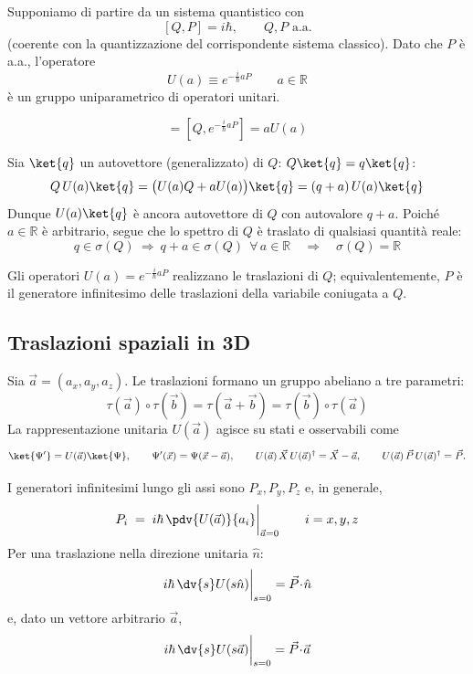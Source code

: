 Supponiamo di partire da un sistema quantistico con
\[
    [Q,P]= i\hbar , \qquad Q,P \text{ a.a.}
\]
(coerente con la quantizzazione del corrispondente sistema classico).
Dato che \(P\) è a.a., l’operatore
\begin{equation}
    U(a)\equiv e^{-\frac{i}{\hbar}aP} \qquad a\in\mathbb{R}
\end{equation}
è un gruppo uniparametrico di operatori unitari.

\begin{equation}
    [Q,U(a)] =\left[ Q, e^{-\frac{i}{\hbar}aP} \right]     = aU(a)
\end{equation}


Sia \(\ket{q}\) un autovettore (generalizzato) di \(Q\): \(Q\ket{q}=q\ket{q}\): 
\[
    Q\,U(a)\ket{q}= \bigl(U(a)Q + aU(a)\bigr)\ket{q}
    = (q+a)\,U(a)\ket{q}
\]
Dunque \(U(a)\ket{q}\) è ancora autovettore di \(Q\) con autovalore \(q+a\).
Poiché \(a\in\mathbb{R}\) è arbitrario, segue che lo spettro di \(Q\) è traslato di qualsiasi quantità reale:
\[
    q\in\sigma(Q)\ \Longrightarrow\ q+a\in\sigma(Q)\ \ \forall\,a\in\mathbb{R}
    \quad\Longrightarrow\quad \sigma(Q)=\mathbb{R}
\]


Gli operatori \(U(a)=e^{-\frac{i}{\hbar}aP}\) realizzano le traslazioni di \(Q\);
equivalentemente, \(P\) è il generatore infinitesimo delle traslazioni della variabile coniugata a \(Q\).


\subsection{Traslazioni spaziali in 3D}

Sia \(\vec a=(a_x,a_y,a_z)\). Le traslazioni formano un gruppo abeliano a tre parametri:
\[
\tau(\vec a)\circ\tau(\vec b)=\tau(\vec a+\vec b)=\tau(\vec b)\circ \tau(\vec a)
\]
La rappresentazione unitaria \(U(\vec a)\) agisce su stati e osservabili come
\[
\ket{\Psi'}=U(\vec a)\ket{\Psi}, 
\qquad \Psi'(\vec x)=\Psi(\vec x-\vec a), 
\qquad U(\vec a)\,\vec X\,U(\vec a)^\dagger=\vec X-\vec a, 
\qquad U(\vec a)\,\vec P\,U(\vec a)^\dagger=\vec P .
\]

I generatori infinitesimi lungo gli assi sono \(P_x,P_y,P_z\) e, in generale,
\begin{equation}
    P_i \;=\; i\hbar\,\pdv{U(\vec a)}{a_i}\bigg|_{\vec a=0}\qquad i=x,y,z
\end{equation}
Per una traslazione nella direzione unitaria \(\hat n\):
\[
i\hbar\,\dv{s}U(s\hat n)\bigg|_{s=0}= \vec P\!\cdot\!\hat n
\]
e, dato un vettore arbitrario \(\vec a\),
\[
i\hbar\,\dv{s}U(s\vec a)\bigg|_{s=0}= \vec P\!\cdot\!\vec a
\]

